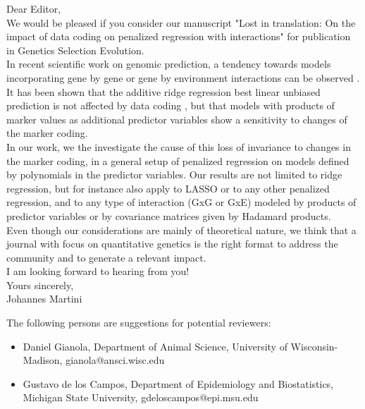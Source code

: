 \documentclass[review]{elsarticle}
\begin{document}
Dear Editor, \\

We would be pleased if you consider our manuscript "Lost in translation: On the impact of data coding
on penalized regression with interactions" for publication in Genetics Selection Evolution.  \\

In recent scientific work on genomic prediction, a tendency towards models incorporating gene by gene or gene by environment interactions can be observed \cite{ober15,jiang15,martini16,perez17}. 
It has been shown that the additive ridge regression best linear unbiased prediction is not affected by data coding \cite{stranden11,martini17}, but that models with products of marker values as additional predictor variables show a sensitivity to changes of the marker coding\cite{he2016does,martini17}.   \\

In our work, we the investigate the cause of this loss of invariance to changes in the marker coding, in a general setup of penalized regression on models defined by polynomials in the predictor variables. Our results are not limited to ridge regression, but for instance also apply to LASSO or to any other penalized regression, and to any type of interaction (GxG or GxE) modeled by products of predictor variables or by covariance matrices given by Hadamard products. \\

Even though our considerations are mainly of theoretical nature, we think that a journal with focus on quantitative genetics is the right format to address the community and to generate a relevant impact.   \\

I am looking forward to hearing from you! \\



Yours sincerely, \\

Johannes Martini \\ \vspace{1cm}

The following persons are suggestions for potential reviewers:
\begin{itemize}
	\item Daniel Gianola, Department of Animal Science, University of Wisconsin-Madison, gianola@ansci.wisc.edu 
	\item Gustavo de los Campos, Department of Epidemiology and Biostatistics,
	Michigan State University, gdeloscampos@epi.msu.edu
\end{itemize} 

\[\]



\end{document}
